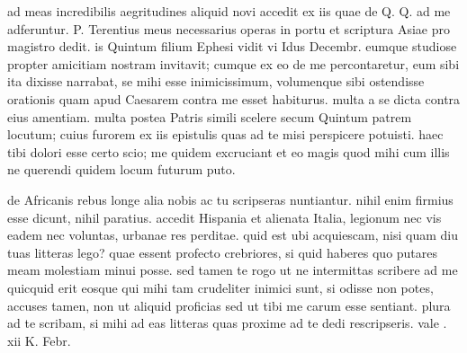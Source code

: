 


 ad meas incredibilis aegritudines aliquid novi accedit ex iis quae de Q. Q. ad me adferuntur. P. Terentius meus necessarius operas in portu et scriptura Asiae pro magistro dedit. is Quintum filium Ephesi vidit vi Idus Decembr. eumque studiose propter amicitiam nostram invitavit; cumque ex eo de me percontaretur, eum sibi ita dixisse narrabat, se mihi esse inimicissimum, volumenque sibi ostendisse orationis quam apud Caesarem contra me esset habiturus. multa a se dicta contra eius amentiam. multa postea Patris simili scelere secum Quintum patrem locutum; cuius furorem ex iis epistulis quas ad te misi perspicere potuisti. haec tibi dolori esse certo scio; me quidem excruciant et eo magis quod mihi cum illis ne querendi quidem locum futurum puto.

 de Africanis rebus longe alia nobis ac tu scripseras nuntiantur. nihil enim firmius esse dicunt, nihil paratius. accedit Hispania et alienata Italia, legionum nec vis eadem nec voluntas, urbanae res perditae. quid est ubi acquiescam, nisi quam diu tuas litteras lego? quae essent profecto crebriores, si quid haberes quo putares meam molestiam minui posse. sed tamen te rogo ut ne intermittas scribere ad me quicquid erit eosque qui mihi tam crudeliter inimici sunt, si odisse non potes, accuses tamen, non ut aliquid proficias sed ut tibi me carum esse sentiant. plura ad te scribam, si mihi ad eas litteras quas proxime ad te dedi rescripseris. vale . xii K. Febr.
